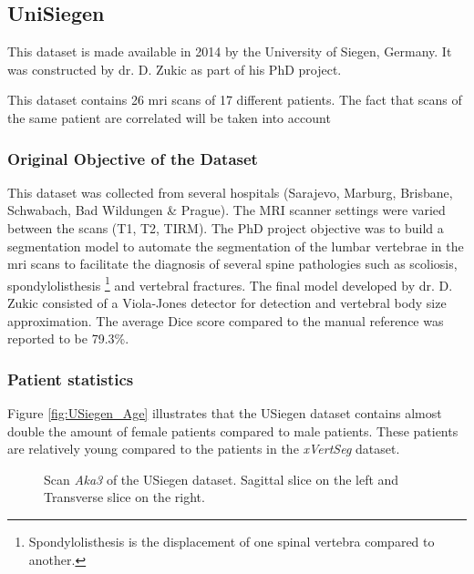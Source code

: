 
\subsection{UniSiegen}

This dataset is made available in 2014 by the University of Siegen, Germany.
It was constructed by dr. D. Zukic \cite{Zukic2014} as part of his PhD project.


This dataset contains 26 \acrshort{mri} scans of 17 different patients. 
The fact that scans of the same patient are correlated will be taken into account 

\subsubsection{Original Objective of the Dataset}

This dataset was collected from several hospitals (Sarajevo, Marburg, Brisbane, Schwabach, Bad Wildungen \& Prague). The MRI scanner settings were varied between the scans (T1, T2, TIRM).
The PhD project objective was to build a segmentation model to automate the segmentation of the lumbar vertebrae in the \acrshort{mri} scans to facilitate the diagnosis of several spine pathologies 
such as scoliosis, spondylolisthesis \footnote{Spondylolisthesis is the displacement of one spinal vertebra compared to another.} and vertebral fractures.
The final model developed by dr. D. Zukic consisted of a Viola-Jones detector for detection and vertebral body size approximation.
The average Dice score compared to the manual reference was reported to be 79.3\%.

\subsubsection{Patient statistics}

Figure \ref{fig:USiegen_Age} illustrates that the USiegen dataset contains almost double the amount of female patients compared to male patients.
These patients are relatively young compared to the patients in the \textit{xVertSeg} dataset.

\begin{SCfigure}[][htb]
    \centering
    \begin{minipage}{.5\textwidth}
        
    \end{minipage}%
    \begin{minipage}{0.5\textwidth}
        
    \end{minipage}
    \caption{Scan \textit{Aka3} of the USiegen dataset. Sagittal slice on the left and Transverse slice on the right.\label{fig:xVertSeg_image002}}
\end{SCfigure}

